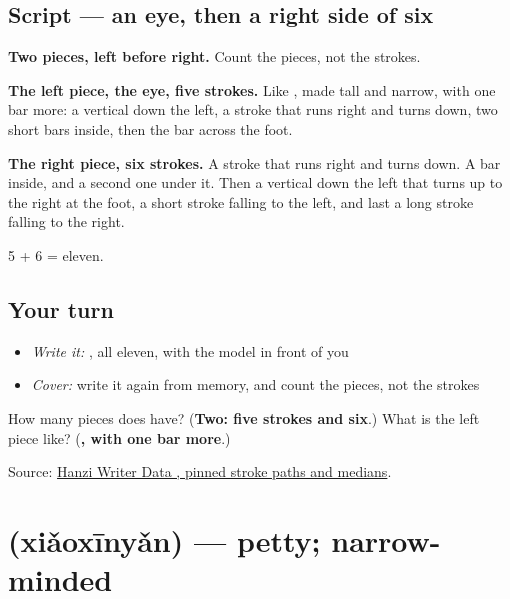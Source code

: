 \subsection*{Script — an eye, then a right side of six}

\begin{quote}
\end{quote}

\textbf{Two pieces, left before right.} Count the pieces, not the strokes.

\textbf{The left piece, the eye, five strokes.} Like , made tall and narrow, with one bar more: a vertical down the left, a stroke that runs right and turns down, two short bars inside, then the bar across the foot.

\textbf{The right piece, six strokes.} A stroke that runs right and turns down. A bar inside, and a second one under it. Then a vertical down the left that turns up to the right at the foot, a short stroke falling to the left, and last a long stroke falling to the right.

5 + 6 = eleven.

\subsection*{Your turn}
\begin{itemize}
\raggedright
  \item \emph{Write it:} , all eleven, with the model in front of you
  \item \emph{Cover:} write it again from memory, and count the pieces, not the strokes
\end{itemize}

\begin{tcolorbox}[breakable,colback=teal!4,colframe=teal!35!black,title={Before you move on}]
How many pieces does  have? (\textbf{Two: five strokes and six}.) What is the left piece like? (\textbf{, with one bar more}.)

Source: \href{https://raw.githubusercontent.com/chanind/hanzi-writer-data/68d10a4b21150cae5e1ebbd223eed289cf32d90c/data/\%E7\%9C\%BC.json}{Hanzi Writer Data , pinned stroke paths and medians}.
\end{tcolorbox}
\section[\texorpdfstring{\zh{小心眼} (xiǎoxīnyǎn)}{小心眼 (xiǎoxīnyǎn)}]{ (xiǎoxīnyǎn) — petty; narrow-minded}


